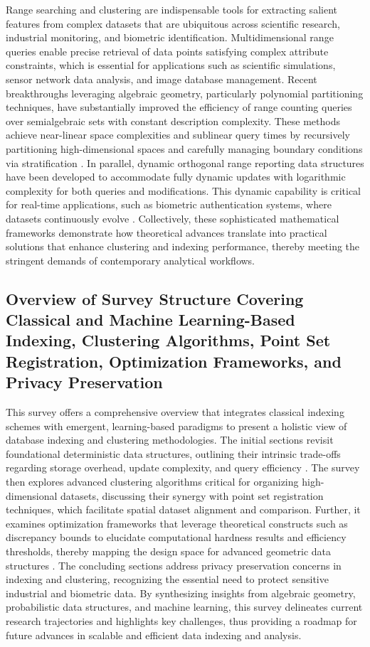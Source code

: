 \documentclass[sigconf]{acmart}
\begin{document}
Range searching and clustering are indispensable tools for extracting salient features from complex datasets that are ubiquitous across scientific research, industrial monitoring, and biometric identification. Multidimensional range queries enable precise retrieval of data points satisfying complex attribute constraints, which is essential for applications such as scientific simulations, sensor network data analysis, and image database management. Recent breakthroughs leveraging algebraic geometry, particularly polynomial partitioning techniques, have substantially improved the efficiency of range counting queries over semialgebraic sets with constant description complexity. These methods achieve near-linear space complexities and sublinear query times by recursively partitioning high-dimensional spaces and carefully managing boundary conditions via stratification \cite{ref2}. In parallel, dynamic orthogonal range reporting data structures have been developed to accommodate fully dynamic updates with logarithmic complexity for both queries and modifications. This dynamic capability is critical for real-time applications, such as biometric authentication systems, where datasets continuously evolve \cite{ref3}. Collectively, these sophisticated mathematical frameworks demonstrate how theoretical advances translate into practical solutions that enhance clustering and indexing performance, thereby meeting the stringent demands of contemporary analytical workflows.

\subsection{Overview of Survey Structure Covering Classical and Machine Learning-Based Indexing, Clustering Algorithms, Point Set Registration, Optimization Frameworks, and Privacy Preservation}

This survey offers a comprehensive overview that integrates classical indexing schemes with emergent, learning-based paradigms to present a holistic view of database indexing and clustering methodologies. The initial sections revisit foundational deterministic data structures, outlining their intrinsic trade-offs regarding storage overhead, update complexity, and query efficiency \cite{ref31}. The survey then explores advanced clustering algorithms critical for organizing high-dimensional datasets, discussing their synergy with point set registration techniques, which facilitate spatial dataset alignment and comparison. Further, it examines optimization frameworks that leverage theoretical constructs such as discrepancy bounds to elucidate computational hardness results and efficiency thresholds, thereby mapping the design space for advanced geometric data structures \cite{ref1,ref2,ref3}. The concluding sections address privacy preservation concerns in indexing and clustering, recognizing the essential need to protect sensitive industrial and biometric data. By synthesizing insights from algebraic geometry, probabilistic data structures, and machine learning, this survey delineates current research trajectories and highlights key challenges, thus providing a roadmap for future advances in scalable and efficient data indexing and analysis.
\end{document}
